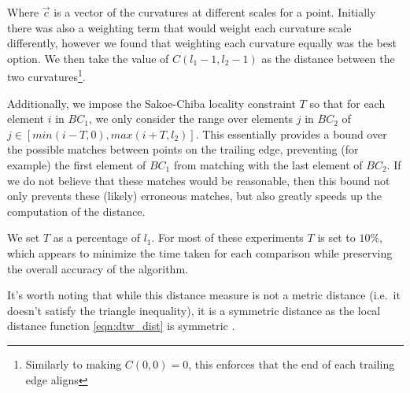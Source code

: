 Where $\vec{c}$ is a vector of the curvatures at different scales for a point.
Initially there was also a weighting term that would weight each curvature scale differently, however we found that weighting each curvature equally was the best option.
We then take the value of $C(l_1-1, l_2-1)$ as the distance between the two curvatures\footnote{Similarly to making $C(0,0) = 0$, this enforces that the end of each trailing edge aligns}.

Additionally, we impose the Sakoe-Chiba \cite{sakoe1978dynamic} locality constraint $T$ so that for each element $i$ in $BC_1$, we only consider the range over elements $j$ in $BC_2$ of $j \in [min(i - T, 0), max(i + T, l_2)]$.
This essentially provides a bound over the possible matches between points on the trailing edge, preventing (for example) the first element of $BC_1$ from matching with the last element of $BC_2$.
If we do not believe that these matches would be reasonable, then this bound not only prevents these (likely) erroneous matches, but also greatly speeds up the computation of the distance.

We set $T$ as a percentage of $l_1$.
For most of these experiments $T$ is set to $10\%$, which appears to minimize the time taken for each comparison while preserving the overall accuracy of the algorithm.

It's worth noting that while this distance measure is not a metric distance (i.e.\ it doesn't satisfy the triangle inequality), it is a symmetric distance as the local distance function \eqref{eqn:dtw_dist} is symmetric \cite{muller2007information}.



